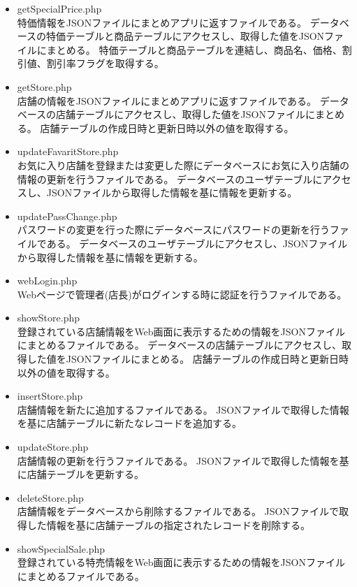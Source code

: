 \documentclass[a4j]{jarticle}
\begin{document}
\begin{itemize}
		\item getSpecialPrice.php \\
		特価情報をJSONファイルにまとめアプリに返すファイルである。
		データベースの特価テーブルと商品テーブルにアクセスし、取得した値をJSONファイルにまとめる。
		特価テーブルと商品テーブルを連結し、商品名、価格、割引値、割引率フラグを取得する。
		\item getStore.php \\
		店舗の情報をJSONファイルにまとめアプリに返すファイルである。
		データベースの店舗テーブルにアクセスし、取得した値をJSONファイルにまとめる。
		店舗テーブルの作成日時と更新日時以外の値を取得する。
		\item updateFavaritStore.php \\
		お気に入り店舗を登録または変更した際にデータベースにお気に入り店舗の情報の更新を行うファイルである。
		データベースのユーザテーブルにアクセスし、JSONファイルから取得した情報を基に情報を更新する。
		\item updatePassChange.php \\
		パスワードの変更を行った際にデータベースにパスワードの更新を行うファイルである。
		データベースのユーザテーブルにアクセスし、JSONファイルから取得した情報を基に情報を更新する。
		\item webLogin.php \\
		Webページで管理者(店長)がログインする時に認証を行うファイルである。
		\item showStore.php \\
		登録されている店舗情報をWeb画面に表示するための情報をJSONファイルにまとめるファイルである。
		データベースの店舗テーブルにアクセスし、取得した値をJSONファイルにまとめる。
		店舗テーブルの作成日時と更新日時以外の値を取得する。
		\item insertStore.php \\
		店舗情報を新たに追加するファイルである。
		JSONファイルで取得した情報を基に店舗テーブルに新たなレコードを追加する。
		\item updateStore.php \\
		店舗情報の更新を行うファイルである。
		JSONファイルで取得した情報を基に店舗テーブルを更新する。
		\item deleteStore.php \\
		店舗情報をデータベースから削除するファイルである。
		JSONファイルで取得した情報を基に店舗テーブルの指定されたレコードを削除する。
		\item showSpecialSale.php \\
		登録されている特売情報をWeb画面に表示するための情報をJSONファイルにまとめるファイルである。

\end{itemize}
\end{document}
